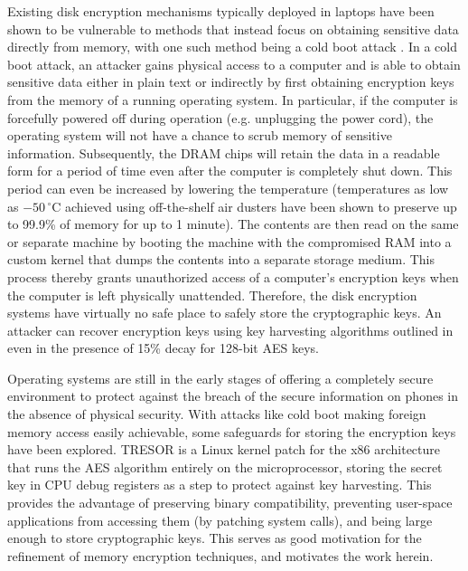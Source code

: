 \documentclass[conference,10pt]{IEEEtran}
\begin{document}
Existing disk encryption mechanisms typically deployed in laptops have been shown to be vulnerable to 
methods that instead focus on obtaining sensitive data directly from memory, with one such method being a 
cold boot attack \cite{coldboot}.  In a cold boot attack, an attacker gains physical access to a computer 
and is able to obtain sensitive data either in plain text or indirectly by first obtaining encryption keys 
from the memory of a running operating system.  In particular, if the computer is forcefully powered off 
during operation (e.g. unplugging the power cord), the operating system will not have a chance to scrub 
memory of sensitive information.  Subsequently, the DRAM chips will retain the data in a readable form for 
a period of time even after the computer is completely shut down.  This period can even be increased by 
lowering the temperature (temperatures as low as $-50\,^{\circ}\mathrm{C}$ achieved using off-the-shelf air 
dusters have been shown to preserve up to 99.9\% of memory for up to 1 minute).  The contents are then read 
on the same or separate machine by booting the machine with the compromised RAM into a custom kernel that 
dumps the contents into a separate storage medium.  This process thereby grants unauthorized access of a 
computer's encryption keys when the computer is left physically unattended.  Therefore, the disk encryption 
systems have virtually no safe place to safely store the cryptographic keys.  An attacker can recover 
encryption keys using key harvesting algorithms outlined in \cite{coldboot} even in the presence of 15\% 
decay for 128-bit AES keys.

Operating systems are still in the early stages of offering a completely secure environment to protect 
against the breach of the secure information on phones in the absence of physical security.  With attacks 
like cold boot making foreign memory access easily achievable, some safeguards for storing the encryption 
keys have been explored.  TRESOR \cite{tresor} is a Linux kernel patch for the x86 architecture that runs 
the AES algorithm entirely on the microprocessor, storing the secret key in CPU debug registers as a step 
to protect against key harvesting.  This provides the advantage of preserving binary compatibility, 
preventing user-space applications from accessing them (by patching system calls), and being large enough 
to store cryptographic keys.  This serves as good motivation for the refinement of memory encryption 
techniques, and motivates the work herein.
\end{document}
